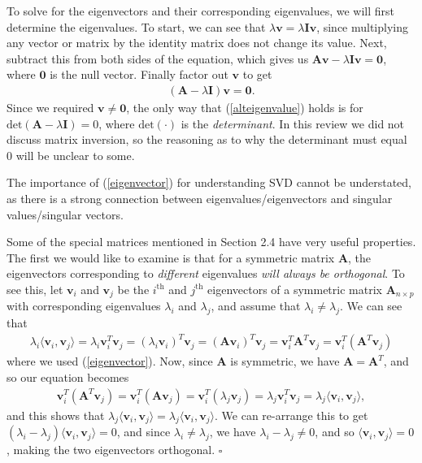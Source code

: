 \documentclass[10pt]{article}
\newcommand{\done}{\hfill $\square$}
\newcommand{\mydef}[1]{\textcolor{SteelBlue3}{\textit{#1}}} %
\begin{document}
To solve for the eigenvectors and their corresponding eigenvalues, we will first determine the eigenvalues. To start, we can see that $\lambda \mathbf{v} = \lambda \mathbf{Iv}$, since multiplying any vector or matrix by the identity matrix does not change its value. Next, subtract this from both sides of the equation, which gives us $\mathbf{Av} - \lambda \mathbf{Iv} = \mathbf{0}$, where $\mathbf{0}$ is the null vector. Finally factor out $\mathbf{v}$ to get 
\begin{align}
    \label{alteigenvalue}
    (\mathbf{A} - \lambda \mathbf{I}) \mathbf{v} = \mathbf{0}.
\end{align}
Since we required $\mathbf{v} \not = \mathbf{0}$, the only way that (\ref{alteigenvalue}) holds is for $\mathrm{det} (\mathbf{A} - \lambda \mathbf{I}) = 0$, where $\mathrm{det}(\cdot)$ is the \mydef{determinant}. In this review we did not discuss matrix inversion, so the reasoning as to why the determinant must equal 0 will be unclear to some. 

The importance of (\ref{eigenvector}) for understanding SVD cannot be understated, as there is a strong connection between eigenvalues/eigenvectors and singular values/singular vectors. 

Some of the special matrices mentioned in Section 2.4 have very useful properties. The first we would like to examine is that for a symmetric matrix $\mathbf{A}$, the eigenvectors corresponding to \textit{different} eigenvalues 
\textit{will always be orthogonal}. 
To see this, let $\mathbf{v}_i$ and $\mathbf{v}_j$ be the $i^{\text{th}}$ and $j^{\text{th}}$ eigenvectors of a symmetric matrix $\mathbf{A}_{n \times p}$ with corresponding eigenvalues $\lambda_i$ and $\lambda_j$, and assume that $\lambda_i \not = \lambda_j$. We can see that 
\begin{align*}
    \lambda_i \langle \mathbf{v}_i, \mathbf{v}_j \rangle = \lambda_i \mathbf{v}_i^T \mathbf{v}_j = (\lambda_i \mathbf{v}_i)^T \mathbf{v}_j = (\mathbf{A} \mathbf{v}_i)^T \mathbf{v}_j = \mathbf{v}_i^T \mathbf{A}^T \mathbf{v}_j = \mathbf{v}_i^T (\mathbf{A}^T \mathbf{v}_j)
\end{align*}
where we used (\ref{eigenvector}). Now, since $\mathbf{A}$ is symmetric, we have $\mathbf{A} = \mathbf{A}^T$, and so our equation becomes 
\begin{align*}
    \mathbf{v}_i^T (\mathbf{A}^T \mathbf{v}_j) = \mathbf{v}_i^T (\mathbf{A} \mathbf{v}_j) = \mathbf{v}_i^T (\lambda_j \mathbf{v}_j) = \lambda_j \mathbf{v}_i^T \mathbf{v}_j = \lambda_j \langle \mathbf{v}_i, \mathbf{v}_j \rangle,
\end{align*}
and this shows that $\lambda_j \langle \mathbf{v}_i, \mathbf{v}_j \rangle = \lambda_j \langle \mathbf{v}_i, \mathbf{v}_j \rangle$. We can re-arrange this to get $(\lambda_i - \lambda_j) \langle \mathbf{v}_i, \mathbf{v}_j \rangle = 0$, and since $\lambda_i \not = \lambda_j$, we have $\lambda_i - \lambda_j \not = 0$, and so $\langle \mathbf{v}_i, \mathbf{v}_j \rangle = 0$, making the two eigenvectors orthogonal. \done 
\end{document}
